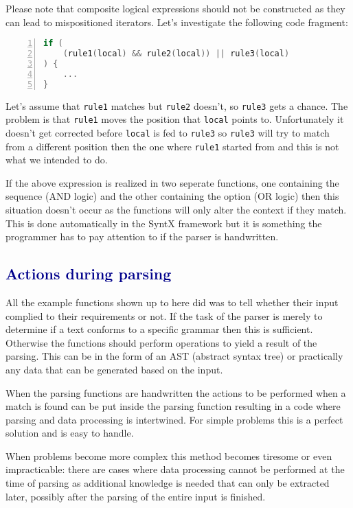 \documentclass[12pt]{article}
\newcommand{\usubsec}[2]{\subsection*{\textcolor{darkblue}{#1}}\label{subsec:#2}\addcontentsline{toc}{subsection}{#1}}
\begin{document}
Please note that composite logical expressions should not be constructed as they can lead to mispositioned
iterators. Let's investigate the following code fragment:

\begin{center}
	\begin{minipage}[h]{0.8\textwidth}
		\begin{lstlisting}[language=C++, breaklines=true, numbers=left]
if (
	(rule1(local) && rule2(local)) || rule3(local)
) {
	...
}
		\end{lstlisting}
	\end{minipage}
\end{center}

Let's assume that \texttt{rule1} matches but \texttt{rule2} doesn't, so \texttt{rule3} gets a chance. The
problem is that \texttt{rule1} moves the position that \texttt{local} points to. Unfortunately it doesn't get
corrected before \texttt{local} is fed to \texttt{rule3} so \texttt{rule3} will try to match from a different
position then the one where \texttt{rule1} started from and this is not what we intended to do.

If the above expression is realized in two seperate functions, one containing the sequence (AND logic) and the
other containing the option (OR logic) then this situation doesn't occur as the functions will only alter the
context if they match. This is done automatically in the SyntX framework but it is something the programmer
has to pay attention to if the parser is handwritten.

\usubsec{Actions during parsing}{actions}
All the example functions shown up to here did was to tell whether their input complied to their requirements
or not. If the task of the parser is merely to determine if a text conforms to a specific grammar then this is
sufficient. Otherwise the functions should perform operations to yield a result of the parsing. This can be in
the form of an AST (abstract syntax tree) or practically any data that can be generated based on the input.

When the parsing functions are handwritten the actions to be performed when a match is found can be put inside
the parsing function resulting in a code where parsing and data processing is intertwined. For simple problems
this is a perfect solution and is easy to handle.

When problems become more complex this method becomes tiresome or even impracticable: there are cases where
data processing cannot be performed at the time of parsing as additional knowledge is needed that can only be
extracted later, possibly after the parsing of the entire input is finished.
\end{document}
